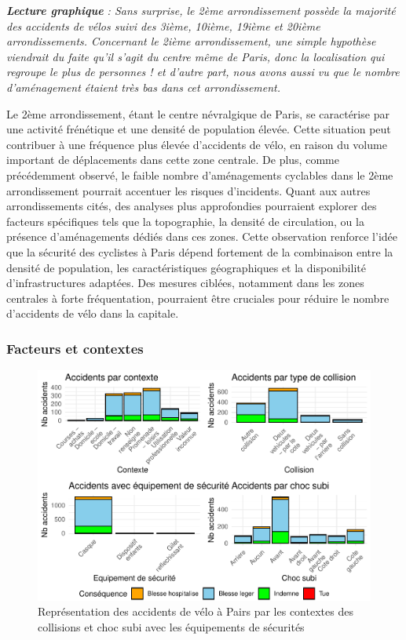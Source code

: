 \documentclass[french,]{compterendu}
\theoremstyle{urcastyle}
\theoremstyle{remark}
\begin{document}
\emph{\textbf{Lecture graphique} : Sans surprise, le 2ème arrondissement possède la majorité des accidents de vélos suivi des 3ième, 10ième, 19ième et 20ième arrondissements. Concernant le 2ième arrondissement, une simple hypothèse viendrait du faite qu'il s'agit du centre même de Paris, donc la localisation qui regroupe le plus de personnes ! et d'autre part, nous avons aussi vu que le nombre d'aménagement étaient très bas dans cet arrondissement.}

Le 2ème arrondissement, étant le centre névralgique de Paris, se caractérise par une activité frénétique et une densité de population élevée. Cette situation peut contribuer à une fréquence plus élevée d'accidents de vélo, en raison du volume important de déplacements dans cette zone centrale. De plus, comme précédemment observé, le faible nombre d'aménagements cyclables dans le 2ème arrondissement pourrait accentuer les risques d'incidents.
Quant aux autres arrondissements cités, des analyses plus approfondies pourraient explorer des facteurs spécifiques tels que la topographie, la densité de circulation, ou la présence d'aménagements dédiés dans ces zones.
Cette observation renforce l'idée que la sécurité des cyclistes à Paris dépend fortement de la combinaison entre la densité de population, les caractéristiques géographiques et la disponibilité d'infrastructures adaptées. Des mesures ciblées, notamment dans les zones centrales à forte fréquentation, pourraient être cruciales pour réduire le nombre d'accidents de vélo dans la capitale.

\hypertarget{facteurs-et-contextes-1}{%
\subsubsection{Facteurs et contextes}\label{facteurs-et-contextes-1}}

\begin{figure}[H]

{\centering \includegraphics[width=0.9\linewidth]{Rapport_ADD_LEO-GABET_files/figure-latex/accCONTEXTE2-1} 

}

\caption{Représentation des accidents de vélo à Pairs par les contextes des collisions et choc subi avec les équipements de sécurités}\label{fig:accCONTEXTE2}
\end{figure}
\end{document}
